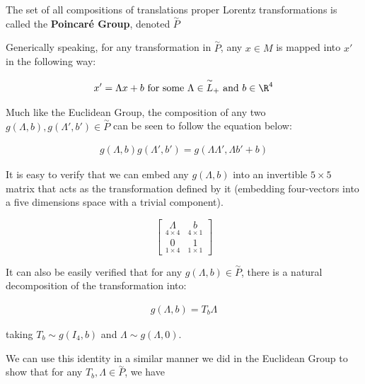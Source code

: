 \begin{definition}
	The set of all compositions of translations proper Lorentz transformations is called the \textbf{Poincar\'e Group}, denoted $\overset{\sim}{P}$
\end{definition}

Generically speaking, for any transformation in $\overset{\sim}{P}$, any $x\in M$ is mapped into $x'$ in the following way:

\begin{equation}
\begin{aligned}
	x' = \Lambda x + b \text{ for some }\Lambda\in\overset{\sim}{L}_+ \text{ and } b\in\R^4
\end{aligned}
\end{equation}

Much like the Euclidean Group, the composition of any two $g(\Lambda,b),g(\Lambda',b')\in\overset{\sim}{P} $  can be seen to follow the equation below:

\begin{equation}
\begin{aligned}
g(\Lambda,b)g(\Lambda',b') = g(\Lambda\Lambda', \Lambda b' + b)
\end{aligned}
\end{equation}

It is easy to verify that we can embed any $g(\Lambda,b)$ into an invertible $5\times 5$ matrix that acts as the transformation defined by it (embedding four-vectors into a five dimensions space with a trivial component).

$$\begin{bmatrix}
	\underset{4\times 4}{\Lambda} & \underset{4\times 1}{b}\\
	\underset{1\times 4}{0} & \underset{1\times 1}{1}
\end{bmatrix}$$

It can also be easily verified that for any $g(\Lambda,b)\in\overset{\sim}{P}$, there is a natural decomposition of the transformation into:

\begin{equation}
\begin{aligned}
g(\Lambda,b)=T_b\Lambda
 \end{aligned}
\end{equation}


\noindent taking $T_b \sim g(I_4,b)$ and $\Lambda \sim g(\Lambda,0)$.

We can use this identity in a similar manner we did in the Euclidean Group to show that for any $T_b,\Lambda\in\overset{\sim}{P}$, we have

